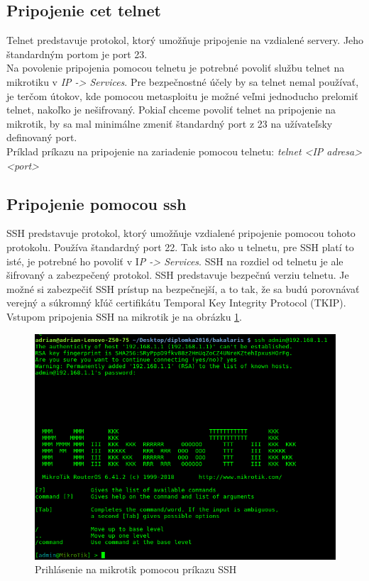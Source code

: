 \subsection{Pripojenie cet telnet}
Telnet predstavuje protokol, ktorý umožňuje pripojenie na vzdialené servery. Jeho štandardným portom je port 23. \\
Na povolenie pripojenia pomocou telnetu je potrebné povoliť službu telnet na mikrotiku v \textit{IP -> Services}. Pre bezpečnostné účely by sa telnet nemal používať, je terčom útokov, kde pomocou metasploitu je možné veľmi jednoducho prelomiť telnet, nakoľko je nešifrovaný. Pokiaľ chceme povoliť telnet na pripojenie na mikrotik, by sa mal minimálne zmeniť štandardný port z 23 na užívateľsky definovaný port.\\
Príklad príkazu na pripojenie na zariadenie pomocou telnetu: \textit{telnet <IP adresa> <port>} 
\subsection{Pripojenie pomocou ssh} 
SSH predstavuje protokol, ktorý umožňuje vzdialené pripojenie pomocou tohoto protokolu. Používa štandardný port 22. Tak isto ako u telnetu, pre SSH platí to isté, je potrebné ho povoliť v I\textit{P -> Services}. SSH na rozdiel od telnetu je ale šifrovaný  a zabezpečený protokol. SSH predstavuje bezpečnú verziu telnetu. Je možné si zabezpečiť SSH prístup na bezpečnejší, a to tak, že sa budú porovnávať verejný  a súkromný kľúč certifikátu Temporal Key Integrity Protocol (TKIP). Vstupom pripojenia SSH na mikrotik je na obrázku \ref{fig:ssh}. 
\begin{figure}[H]
\centering
\includegraphics[scale=0.4]{../text/ssh.png}
\caption{Prihlásenie na mikrotik pomocou príkazu SSH}
\label{fig:ssh}
\end{figure}
